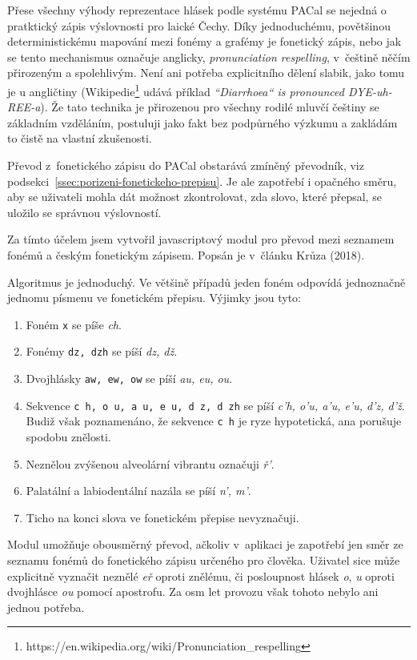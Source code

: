 Přese všechny výhody reprezentace hlásek podle systému PACal se nejedná o
pratktický zápis výslovnosti pro laické Čechy. Díky jednoduchému, povětšinou
deterministickému mapování mezi fonémy a grafémy je fonetický zápis, nebo jak
se tento mechanismus označuje anglicky, {\em pronunciation respelling},
v~češtině něčím přirozeným a spolehlivým. Není ani potřeba explicitního dělení
slabik, jako tomu je u angličtiny
(Wikipedie\footnote{https://en.wikipedia.org/wiki/Pronunciation\_respelling}
udává příklad {\em ``Diarrhoea`` is pronounced DYE-uh-REE-a}).
Že tato technika je přirozenou pro všechny rodilé mluvčí češtiny se základním vzděláním,
postuluji jako fakt bez podpůrného výzkumu a zakládám to čistě na vlastní
zkušenosti.

Převod z~fonetického zápisu do PACal obstarává zmíněný převodník, viz
podsekci~\ref{ssec:porizeni-fonetickeho-prepisu}. Je ale zapotřebí i opačného
směru, aby se uživateli mohla dát možnost zkontrolovat, zda slovo, které
přepsal, se uložilo se správnou výslovností.

Za tímto účelem jsem vytvořil javascriptový modul pro převod mezi seznamem
fonémů a českým fonetickým zápisem. Popsán je v~článku Krůza (2018)\cite{biblio:KrPhoneticTranscription2018}.

Algoritmus je jednoduchý. Ve většině případů jeden foném odpovídá jednoznačně
jednomu písmenu ve fonetickém přepisu. Výjimky jsou tyto:
\begin{enumerate}
\item{Foném \texttt{x} se píše {\em ch}.}
\item{Fonémy \texttt{dz, dzh} se píší {\em dz, dž}.}
\item{Dvojhlásky \texttt{aw, ew, ow} se píší {\em au, eu, ou}.}
\item{
    Sekvence \texttt{c h, o u, a u, e u, d z, d zh} se píší
    {\em c'h, o'u, a'u, e'u, d'z, d'ž}.
    Budiž však poznamenáno, že sekvence \texttt{c h} je ryze hypotetická, ana
    porušuje spodobu znělosti.
}
\item{
    Neznělou zvýšenou alveolární vibrantu označuji {\em ř'}.
}
\item{
    Palatální a labiodentální nazála se píší {\em n', m'}.
}
\item{Ticho na konci slova ve fonetickém přepise nevyznačuji.}
\end{enumerate}

Modul umožňuje obousměrný převod, ačkoliv v~aplikaci je zapotřebí jen směr ze seznamu fonémů do
fonetického zápisu určeného pro člověka. Uživatel sice může explicitně vyznačit
neznělé {\em eř} oproti znělému, či posloupnost hlásek {\em o}, {\em u} oproti
dvojhlásce {\em ou} pomocí apostrofu. Za osm let provozu však tohoto nebylo ani
jednou potřeba.

